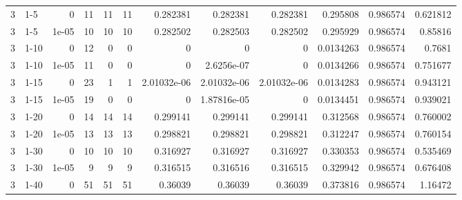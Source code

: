 \begin{tabular}{rlrrrrrrrrrr}
     3 & 1-5    &      0     &          11 &                11 &                11 &     0.282381    &     0.282381    &      0.282381    &        0.295808  &               0.986574 &           0.621812 \\
     3 & 1-5    &      1e-05 &          10 &                10 &                10 &     0.282502    &     0.282503    &      0.282502    &        0.295929  &               0.986574 &           0.85816  \\
     3 & 1-10   &      0     &          12 &                 0 &                 0 &     0           &     0           &      0           &        0.0134263 &               0.986574 &           0.7681   \\
     3 & 1-10   &      1e-05 &          11 &                 0 &                 0 &     0           &     2.6256e-07  &      0           &        0.0134266 &               0.986574 &           0.751677 \\
     3 & 1-15   &      0     &          23 &                 1 &                 1 &     2.01032e-06 &     2.01032e-06 &      2.01032e-06 &        0.0134283 &               0.986574 &           0.943121 \\
     3 & 1-15   &      1e-05 &          19 &                 0 &                 0 &     0           &     1.87816e-05 &      0           &        0.0134451 &               0.986574 &           0.939021 \\
     3 & 1-20   &      0     &          14 &                14 &                14 &     0.299141    &     0.299141    &      0.299141    &        0.312568  &               0.986574 &           0.760002 \\
     3 & 1-20   &      1e-05 &          13 &                13 &                13 &     0.298821    &     0.298821    &      0.298821    &        0.312247  &               0.986574 &           0.760154 \\
     3 & 1-30   &      0     &          10 &                10 &                10 &     0.316927    &     0.316927    &      0.316927    &        0.330353  &               0.986574 &           0.535469 \\
     3 & 1-30   &      1e-05 &           9 &                 9 &                 9 &     0.316515    &     0.316516    &      0.316515    &        0.329942  &               0.986574 &           0.676408 \\
     3 & 1-40   &      0     &          51 &                51 &                51 &     0.36039     &     0.36039     &      0.36039     &        0.373816  &               0.986574 &           1.16472  \\

\end{tabular}

